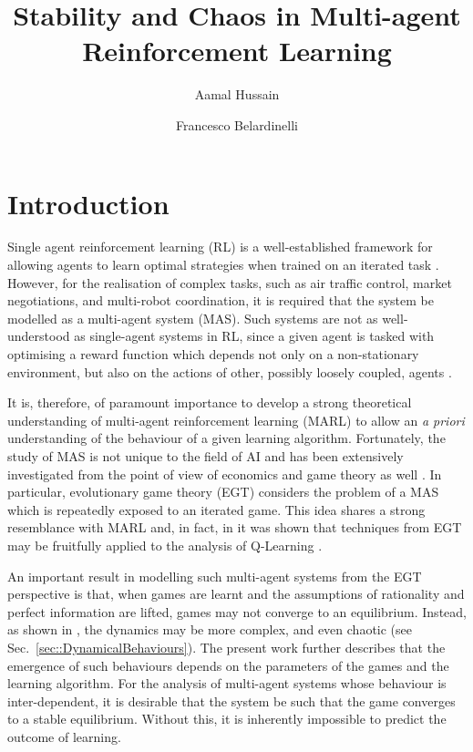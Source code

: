 \documentclass[sigconf,anonymous]{aamas}
\title[InstabilityinMARL]{Stability and Chaos in Multi-agent Reinforcement Learning}
\author{Aamal Hussain}
\affiliation{
  \department{Department of Computing}
  \institution{Imperial College London}}
\author{Francesco Belardinelli}
\affiliation{
  \department{Department of Computing}
  \institution{Imperial College London}}
\begin{document}

\pagestyle{fancy}
\fancyhead{}


\maketitle 


\section{Introduction}
\label{sec::Intro}

Single agent reinforcement learning (RL) is a well-established
framework for allowing agents to learn optimal strategies when trained
on an iterated task
\cite{Vinyals2019}. However, for the realisation of complex tasks,
such as air traffic control, market negotiations, and multi-robot
coordination, it is required that the system be modelled as a
multi-agent system (MAS). Such systems are not as well-understood as
single-agent systems in RL, since a given agent is tasked with
optimising a reward function which depends not only on a
non-stationary environment, but also on the actions of other, possibly
loosely coupled, agents \cite{SchwartzMulti-agentApproach}.

It is, therefore, of paramount importance to develop a strong
theoretical understanding of multi-agent reinforcement learning (MARL)
to allow an {\em a priori} understanding of the behaviour of a given
learning algorithm. Fortunately, the study of MAS is not unique to the
field of AI and has been extensively investigated from the point of view of
economics and game theory as well
\cite{ShohamMultiagentFoundations}. In particular,
evolutionary game theory (EGT) considers the problem of a MAS which is
repeatedly exposed to an iterated game. This idea shares a strong
resemblance with MARL and, in fact, in \cite{Tuyls2006AnGames} it was
shown that techniques from EGT may be fruitfully applied to the analysis of
Q-Learning \cite{Sutton2018}.

An important result in modelling such multi-agent systems from the EGT
perspective is that, when games are learnt and the assumptions of
rationality and perfect information are lifted, games may not converge
to an equilibrium. Instead, as shown in \cite{Sanders2018}, the
dynamics may be more complex, and even chaotic (see
Sec.~\ref{sec::DynamicalBehaviours}). The present work further
describes that the emergence of such behaviours depends on the
parameters of the games and the learning algorithm. For the analysis
of multi-agent systems whose behaviour is inter-dependent, it is
desirable that the system be such that the game converges to a
stable equilibrium. Without this, it is inherently impossible to
predict the outcome of learning.
\end{document}
